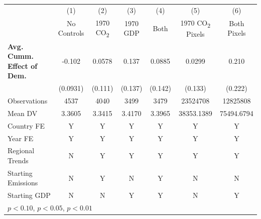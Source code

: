 \begin{tabular}{l*{6}{c}}
\hline
            &\multicolumn{1}{c}{(1)}&\multicolumn{1}{c}{(2)}&\multicolumn{1}{c}{(3)}&\multicolumn{1}{c}{(4)}&\multicolumn{1}{c}{(5)}&\multicolumn{1}{c}{(6)}\\
            &\multicolumn{1}{c}{No Controls}&\multicolumn{1}{c}{1970 CO\textsubscript{2}}&\multicolumn{1}{c}{1970 GDP}&\multicolumn{1}{c}{Both}&\multicolumn{1}{c}{1970 CO\textsubscript{2} Pixels}&\multicolumn{1}{c}{Both Pixels}\\
\hline
\textbf{Avg. Cumm. Effect of Dem.}&      -0.102         &      0.0578         &       0.137         &      0.0885         &      0.0299         &       0.210         \\
            &    (0.0931)         &     (0.111)         &     (0.137)         &     (0.142)         &     (0.133)         &     (0.222)         \\
\midrule
Observations&        4537         &        4040         &        3499         &        3479         &    23524708         &    12825808         \\
Mean DV     &      3.3605         &      3.3415         &      3.4170         &      3.3965         &  38353.1389         &  75494.6794         \\
Country FE  &           Y         &           Y         &           Y         &           Y         &           Y         &           Y         \\
Year FE     &           Y         &           Y         &           Y         &           Y         &           Y         &           Y         \\
Regional Trends&           N         &           Y         &           Y         &           Y         &           Y         &           Y         \\
Starting Emissions&           N         &           Y         &           N         &           Y         &           N         &           N         \\
Starting GDP&           N         &           N         &           Y         &           Y         &           N         &           Y         \\
\hline
\multicolumn{7}{l}{\footnotesize \sym{*} \(p<0.10\), \sym{**} \(p<0.05\), \sym{***} \(p<0.01\)}\\
\end{tabular}
